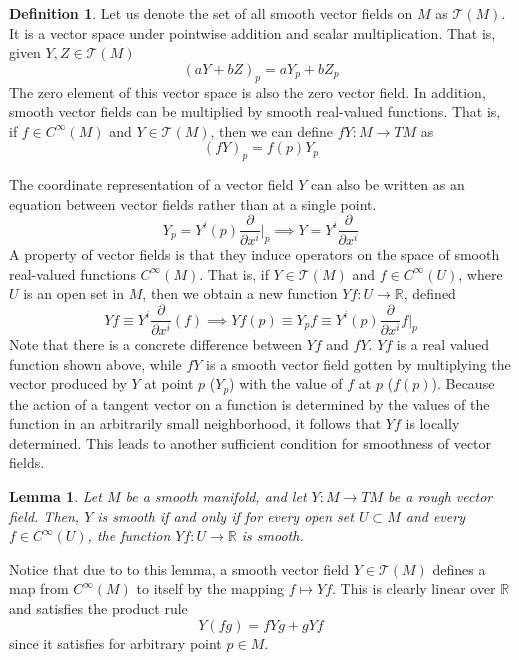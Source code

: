 \documentclass{article}
\newtheorem{lemma}[theorem]{Lemma}
\theoremstyle{remark}
\theoremstyle{definition}
\newtheorem{definition}{Definition}[section]
\begin{document}
\begin{definition}
Let us denote the set of all smooth vector fields on $M$ as $\mathcal{T}(M)$. It is a vector space under pointwise addition and scalar multiplication. That is, given $Y, Z \in \mathcal{T}(M)$
\[(a Y + b Z)_p = a Y_p + b Z_p\]
The zero element of this vector space is also the zero vector field. In addition, smooth vector fields can be multiplied by smooth real-valued functions. That is, if $f \in C^\infty (M)$ and $Y \in \mathcal{T}(M)$, then we can define $f Y: M \longrightarrow TM$ as 
\[(fY)_p = f(p) Y_p\]
\end{definition}

The coordinate representation of a vector field $Y$ can also be written as an equation between vector fields rather than at a single point.
\[Y_p = Y^i (p) \frac{\partial}{\partial x^i} \bigg|_p \implies Y = Y^i \frac{\partial}{\partial x^i} \]
A property of vector fields is that they induce operators on the space of smooth real-valued functions $C^\infty (M)$. That is, if $Y \in \mathcal{T}(M)$ and $f \in C^\infty (U)$, where $U$ is an open set in $M$, then we obtain a new function $Y f: U \longrightarrow \mathbb{R}$, defined 
\[Y f \equiv Y^i \frac{\partial}{\partial x^i} (f) \implies Y f(p) \equiv Y_p f \equiv Y^i (p) \frac{\partial}{\partial x^i} f \bigg|_p \]
Note that there is a concrete difference between $Y f$ and $f Y$. $Y f$ is a real valued function shown above, while $f Y$ is a smooth vector field gotten by multiplying the vector produced by $Y$ at point $p$ ($Y_p$) with the value of $f$ at $p$ ($f(p)$). Because the action of a tangent vector on a function is determined by the values of the function in an arbitrarily small neighborhood, it follows that $Y f$ is locally determined. This leads to another sufficient condition for smoothness of vector fields. 

\begin{lemma}
Let $M$ be a smooth manifold, and let $Y: M \longrightarrow TM$ be a rough vector field. Then, $Y$ is smooth if and only if for every open set $U \subset M$ and every $f \in C^\infty (U)$, the function $Y f: U \longrightarrow \mathbb{R}$ is smooth. 
\end{lemma}

Notice that due to to this lemma, a smooth vector field $Y \in \mathcal{T}(M)$ defines a map from $C^\infty(M)$ to itself by the mapping $f \mapsto Y f$. This is clearly linear over $\mathbb{R}$ and satisfies the product rule 
\[Y(f g) = f Y g + g Y f\]
since it satisfies for arbitrary point $p \in M$. 
\end{document}
